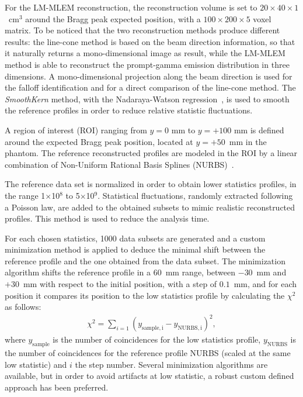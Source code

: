 For the LM-MLEM reconstruction, the reconstruction volume is set to $20\times40\times1$~cm$^3$ around the Bragg peak expected position, with a $100\times200\times5$ voxel matrix. To be noticed that the two reconstruction methods produce different results: the line-cone method is based on the beam direction information, so that it naturally returns a mono-dimensional image as result, while the LM-MLEM method is able to reconstruct the prompt-gamma emission distribution in three dimensions. A mono-dimensional projection along the beam direction is used for the falloff identification and for a direct comparison of the line-cone method.
The \textit{SmoothKern} method, with the Nadaraya-Watson regression~\cite{Nadaraya_regression, Watson_regression}, is used to smooth the reference profiles in order to reduce relative statistic fluctuations.

A region of interest (ROI) ranging from $y=0$ mm to $y=+100$ mm is defined around the expected Bragg peak position, located at $y=+50$~mm in the phantom. The reference reconstructed profiles are modeled in the ROI by a linear combination of Non-Uniform Rational Basis Splines (NURBS)~\cite{NURBS}. 

The reference data set is normalized in order to obtain lower statistics profiles, in the range 1$\times$10$^8$ to 5$\times$10$^9$. Statistical fluctuations, randomly extracted following a Poisson law, are added to the obtained subsets to mimic realistic reconstructed profiles. This method is used to reduce the analysis time.

For each chosen statistics, 1000 data subsets are generated and a custom minimization method is applied to deduce the minimal shift between the reference profile and the one obtained from the data subset. The minimization algorithm shifts the reference profile in a 60~mm range, between $-30$~mm and $+30$~mm with respect to the initial position, with a step of $0.1$~mm, and for each position it compares its position to the low statistics profile by calculating the $\chi^2$ as follows:
\begin{eqnarray}
\chi^2 = \sum\limits_{i=1} {(y_{\mathrm{sample,i}}-y_{\mathrm{NURBS,i}})^2},
\end{eqnarray}
where $y_{\mathrm{sample}}$ is the number of coincidences for the low statistics profile, $y_{\mathrm{NURBS}}$ is the number of coincidences for the reference profile NURBS (scaled at the same low statistic) and $i$ the step number. Several minimization algorithms are available, but in order to avoid artifacts at low statistic, a robust custom defined approach has been preferred.

